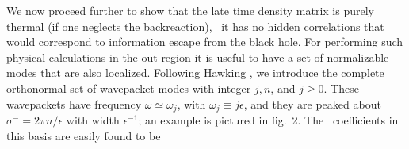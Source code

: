 We now proceed further to show that the late time density matrix is purely
thermal (if one neglects the backreaction), \ie\ it has no hidden
correlations that would correspond to
information escape from the black hole.
For performing such physical calculations in the out region it is
useful to have a set of normalizable modes that are also
localized.  Following
Hawking , we introduce the complete
orthonormal set of wavepacket modes
%
\eqn{}
%
with integer $j,n$, and $j \ge 0$.
These wavepackets have frequency $\omega\simeq
\omega_j$, with $\omega_{j}\equiv j\epsilon$, and they are
peaked about $\sigma^{-}={2\pi n/\epsilon}$ with width $\epsilon^{-1}$; an
example is pictured in fig.~2.
The \Bog\ coefficients in this basis are easily found to be
%
\eqn{}
%



